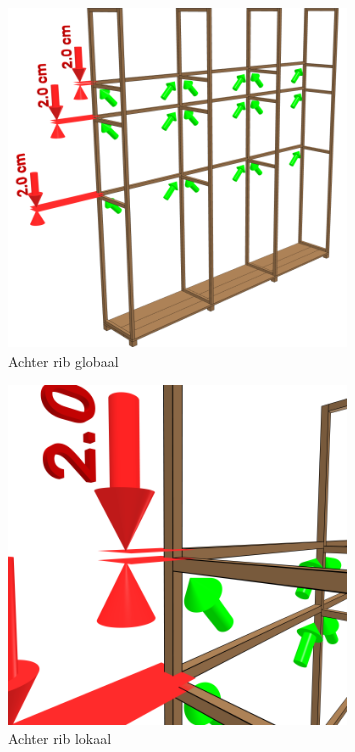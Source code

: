 \documentclass{article}
\begin{document}
\begin{figure}[h!]
    \centering
    \includegraphics[width=0.8\textwidth]{scene 5 - achterrib a.png}
    \caption{Achter rib globaal}
    \label{fig:stap 5a}
\end{figure}

\begin{figure}[h!]
    \centering
    \includegraphics[width=0.8\textwidth]{scene 5 - achterrib b.png}
    \caption{Achter rib lokaal}
    \label{fig:stap 5b}
\end{figure}

\clearpage
\newpage
\end{document}
